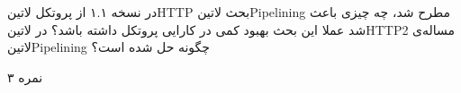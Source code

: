 \documentclass[../main.tex]{subfiles}
\begin{document}

در نسخه ۱.۱ از پروتکل ‌لاتین{HTTP} بحث ‌لاتین{Pipelining} مطرح شد، چه چیزی باعث شد عملا این بحث بهبود کمی در کارایی پروتکل داشته باشد؟
در ‌لاتین{HTTP2} مساله‌ی ‌لاتین{Pipelining} چگونه حل شده است؟

۳ نمره
\end{document}
